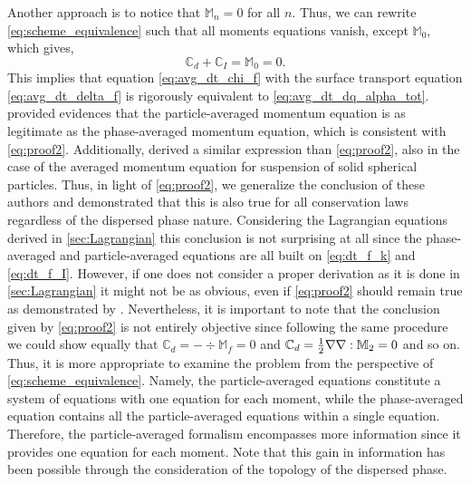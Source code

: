 Another approach is to notice that $\mathbb{M}_n=0$ for all $n$. Thus, we can rewrite \ref{eq:scheme_equivalence} such that all moments equations vanish, except $\mathbb{M}_0$, which gives, 
\begin{equation}
    \mathbb{C}_d 
    + \mathbb{C}_I
    = \mathbb{M}_0 = 0.
    \label{eq:proof2}
\end{equation}
This implies that equation \ref{eq:avg_dt_chi_f} with the surface transport equation \ref{eq:avg_dt_delta_f} is rigorously equivalent to \ref{eq:avg_dt_dq_alpha_tot}.
\citet[Appendix A]{zhang1997momentum} provided evidences that the particle-averaged momentum equation is as legitimate as the phase-averaged momentum equation, which is consistent with \ref{eq:proof2}. 
Additionally, \citet[Appendix A]{nott2011suspension} derived a similar expression than \ref{eq:proof2}, also in the case of the averaged momentum equation for suspension of solid spherical particles.
Thus, in light of \ref{eq:proof2}, we generalize the conclusion of these authors and demonstrated that this is also true for all conservation laws regardless of the dispersed phase nature.  
Considering the Lagrangian equations derived in \ref{sec:Lagrangian} this conclusion is not surprising at all since the phase-averaged and particle-averaged equations are all built on \ref{eq:dt_f_k} and \ref{eq:dt_f_I}.
However, if one does not consider a proper derivation as it is done in \ref{sec:Lagrangian} it might not be as obvious, even if \ref{eq:proof2} should remain true as demonstrated by \citet{zhang1997momentum,nott2011suspension}.
Nevertheless, it is important to note that the conclusion given by \ref{eq:proof2} is not entirely objective since following the same procedure we could show equally that $\mathbb{C}_d  = -\div\mathbb{M}_f=0$ and $\mathbb{C}_d  = \frac{1}{2}\mathbf{\nabla}\mathbf{\nabla}:\mathbb{M}_2=0$ and so on. 
Thus, it is more appropriate to examine the problem from the perspective of \ref{eq:scheme_equivalence}. 
Namely, the particle-averaged equations constitute a system of equations with one equation for each moment, while the phase-averaged equation contains all the particle-averaged equations within a single equation.
Therefore, the particle-averaged formalism encompasses more information since it provides one equation for each moment. 
Note that this gain in information has been possible through the consideration of the topology of the dispersed phase. 

